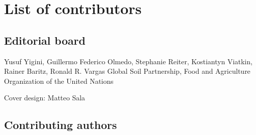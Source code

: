\documentclass[10pt,b5paper,]{book}
\theoremstyle{definition}
\theoremstyle{definition}
\theoremstyle{definition}
\theoremstyle{remark}
\begin{document}
\frontmatter
{}
\tableofcontents
\listoffigures
\listoftables
\printnomenclature

\hypertarget{list-of-contributors}{%
\chapter*{List of contributors}\label{list-of-contributors}}

\hypertarget{editorial-board}{%
\section*{Editorial board}\label{editorial-board}}

Yusuf Yigini, Guillermo Federico Olmedo, Stephanie Reiter, Kostiantyn
Viatkin, Rainer Baritz, Ronald R. Vargas Global Soil Partnership, Food
and Agriculture Organization of the United Nations

Cover design: Matteo Sala

\hypertarget{contributing-authors}{%
\section*{Contributing authors}\label{contributing-authors}}
\end{document}
